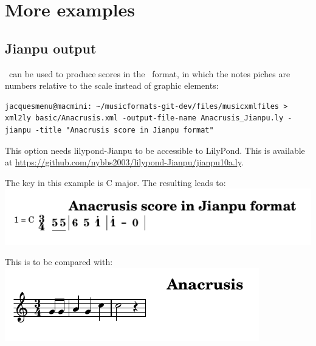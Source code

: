 
\chapter{More examples}


\section{Jianpu output}

\xmlToLy\ can be used to produce scores in the \jianpu\ format, in which the notes piches are numbers relative to the scale instead of graphic elements:
\begin{lstlisting}[language=Terminal]
jacquesmenu@macmini: ~/musicformats-git-dev/files/musicxmlfiles > xml2ly basic/Anacrusis.xml -output-file-name Anacrusis_Jianpu.ly -jianpu -title "Anacrusis score in Jianpu format"
\end{lstlisting}

This option needs lilypond-Jianpu to be accessible to LilyPond. This is available at \url{https://github.com/nybbs2003/lilypond-Jianpu/jianpu10a.ly}.
          
The key in this example is C major. The resulting  leads to:\\
\includegraphics[scale=1]{../graphics/Anacrusis_Jianpu.png}

This is to be compared with:\\
\includegraphics[scale=1]{../graphics/Anacrusis.png}


